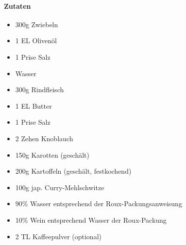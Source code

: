 \newpage
{}
\paragraph{Zutaten}
\begin{itemize}[noitemsep]
	\item 300g Zwiebeln
	\item 1 EL Olivenöl
	\item 1 Prise Salz
	\item Wasser
	\item 300g Rindfleisch
	\item 1 EL Butter
	\item 1 Prise Salz
	\item 2 Zehen Knoblauch
	\item 150g Karotten (geschält)
	\item 200g Kartoffeln (geschält, festkochend)
	\item 100g jap. Curry-Mehlschwitze
	\item 90\% Wasser entsprechend der Roux-Packungsanweisung
	\item 10\% Wein entsprechend Wasser der Roux-Packung
	\item 2 TL Kaffeepulver (optional)
\end{itemize}

